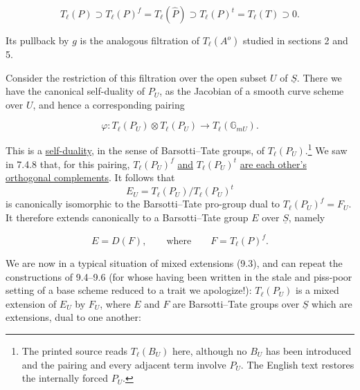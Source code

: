 \begin{equation}\tag{12.8.6}
 T_\ell(P)\supset T_\ell(P)^f=T_\ell(\widehat P)
 \supset T_\ell(P)^t=T_\ell(T)\supset0.
\end{equation}

\noindent
Its pullback by $g$ is the analogous filtration of $T_\ell(A^{o})$
studied in sections 2 and 5.

Consider the restriction of this filtration over the open subset $U$ of
$\underline S$. There we have the canonical self-duality of $P_U$, as the
Jacobian of a smooth curve scheme over $U$, and hence a corresponding
pairing

\begin{equation}\tag{12.8.7}
 \varphi:T_\ell(P_U)\otimes T_\ell(P_U)
 \longrightarrow T_\ell(\mathbb G_{mU}).
\end{equation}

\noindent
This is a \underline{self-duality}, in the sense of Barsotti--Tate groups,
of $T_\ell(P_U)$.\footnote{The printed source reads $T_\ell(B_U)$ here,
although no $B_U$ has been introduced and the pairing and every adjacent
term involve $P_U$. The English text restores the internally forced
$P_U$.} We saw in 7.4.8 that, for this pairing,
$T_\ell(P_U)^f$ \underline{and} $T_\ell(P_U)^t$ \underline{are each
other's orthogonal complements}. It follows that
\[
 E_U=T_\ell(P_U)/T_\ell(P_U)^t
\]
is canonically isomorphic to the Barsotti--Tate pro-group dual to
$T_\ell(P_U)^f=F_U$. It therefore extends canonically to a Barsotti--Tate
group $E$ over $\underline S$, namely

\begin{equation}\tag{12.8.8}
 E=D(F),\qquad\text{where}\qquad F=T_\ell(P)^f.
\end{equation}

\noindent
We are now in a typical situation of mixed extensions (9.3), and can repeat
the constructions of 9.4--9.6 (for whose having been written in the stale
and piss-poor setting of a base scheme reduced to a trait we apologize!):
$T_\ell(P_U)$ is a mixed extension of $E_U$ by $F_U$, where $E$ and $F$
are Barsotti--Tate groups over $\underline S$ which are extensions, dual to
one another:
